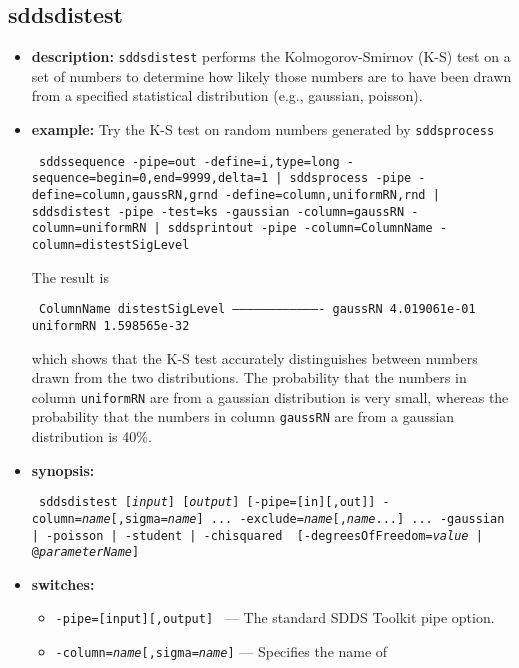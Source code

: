 \newpage
\subsection{sddsdistest}
\label{sddsdistest}

\begin{itemize}
\item {\bf description:} 
{\tt sddsdistest} performs the Kolmogorov-Smirnov (K-S) test on a
set of numbers to determine how likely those numbers are to have been drawn from
a specified statistical distribution (e.g., gaussian, poisson).

\item {\bf example:}
Try the K-S test on random numbers generated by {\tt sddsprocess}
\begin{flushleft}{\tt
sddssequence -pipe=out -define=i,type=long -sequence=begin=0,end=9999,delta=1 
| sddsprocess -pipe -define=column,gaussRN,grnd -define=column,uniformRN,rnd 
| sddsdistest -pipe -test=ks -gaussian -column=gaussRN -column=uniformRN 
| sddsprintout -pipe -column=ColumnName -column=distestSigLevel
}\end{flushleft}
The result is 
\begin{flushleft}{\tt
    ColumnName      distestSigLevel 
-------------------------------------
     gaussRN         4.019061e-01 
    uniformRN        1.598565e-32 
}\end{flushleft}
which shows that the K-S test accurately distinguishes between numbers
drawn from the two distributions.  The probability that the numbers in
column {\tt uniformRN} are from a gaussian distribution is very small, whereas
the probability that the numbers in column {\tt gaussRN} are from a
gaussian distribution is 40\%.
\item {\bf synopsis:}
\begin{flushleft}{\tt
sddsdistest [{\em input}] [{\em output}] [-pipe=[in][,out]] 
-column={\em name}[,sigma={\em name}] ... -exclude={\em name}[,{\em name}...] ...
{-gaussian | -poisson | -student | -chisquared }
[-degreesOfFreedom={{\em value} | @{\em parameterName}}]
}\end{flushleft}
\item {\bf switches:}
    \begin{itemize}
    \item {\tt -pipe=[input][,output] } --- The standard SDDS Toolkit pipe option.
        \item {\tt -column={\em name}[,sigma={\em name}]} --- Specifies the name of

\end{itemize}
\end{itemize}
